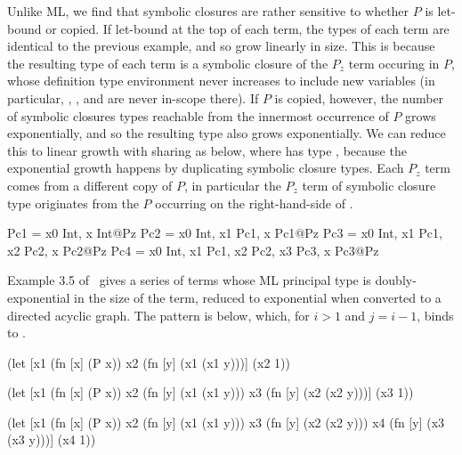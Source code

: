 \documentclass[11pt,final]{iuthesis}
\begin{document}
Unlike ML, we find that symbolic closures are rather sensitive to whether $P$
is let-bound or copied.
If let-bound at the top of each term, the types of each term are
identical to the previous example, and so grow linearly in size.
This is because the resulting type of each term is a symbolic closure of the
$P_z$ term occuring in $P$, whose definition type environment
never increases to include new variables (in particular, , , and 
are never in-scope there).
If $P$ is copied, however, the number of symbolic closures types reachable from
the innermost occurrence of $P$ grows exponentially, and so the resulting type also
grows exponentially.
We can reduce this to linear growth with sharing as below, where  has type ,
because the exponential growth happens by duplicating symbolic closure types.
Each $P_z$ term comes from a different copy of $P$, in particular
the $P_z$ term of symbolic closure type  originates from the $P$ occurring on the right-hand-side of .

\begin{cljlisting}
Pc1 = {x0 Int,                         x Int}@Pz
Pc2 = {x0 Int, x1 Pc1,                 x Pc1}@Pz
Pc3 = {x0 Int, x1 Pc1, x2 Pc2,         x Pc2}@Pz
Pc4 = {x0 Int, x1 Pc1, x2 Pc2, x3 Pc3, x Pc3}@Pz
\end{cljlisting}

Example 3.5 of~\cite{kanellakis1989polymorphic} gives a series of terms whose ML principal
type is doubly-exponential in the size of the term,
reduced to exponential when converted to a directed acyclic graph.
The pattern is below, which, for $i>1$ and $j=i-1$, binds  to .

\begin{minipage}[t]{0.31\linewidth}
\begin{cljlisting}
(let [x1 (fn [x] (P x))
      x2 (fn [y]
           (x1 (x1 y)))]
  (x2 1))
\end{cljlisting}
\end{minipage}
%
\begin{minipage}[t]{0.31\linewidth}
\begin{cljlisting}
(let [x1 (fn [x] (P x))
      x2 (fn [y]
           (x1 (x1 y)))
      x3 (fn [y]
           (x2 (x2 y)))]
  (x3 1))
\end{cljlisting}
\end{minipage}
%
\begin{minipage}[t]{0.31\linewidth}
\begin{cljlisting}
(let [x1 (fn [x] (P x))
      x2 (fn [y]
           (x1 (x1 y)))
      x3 (fn [y]
           (x2 (x2 y)))
      x4 (fn [y]
           (x3 (x3 y)))]
  (x4 1))
\end{cljlisting}
\end{minipage}
\end{document}
